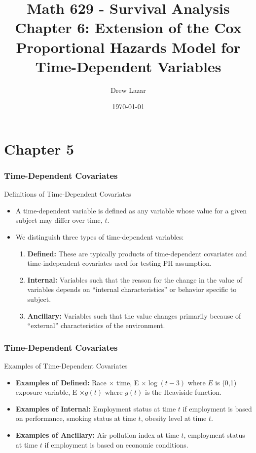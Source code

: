\documentclass{beamer}
\title{Math 629 - Survival Analysis \\ Chapter 6: Extension
of the Cox Proportional Hazards Model for Time-Dependent Variables
}
\author{Drew Lazar}
\institute{Ball State University}
\date{\today}
\theoremstyle{definition}
\begin{document}
\begin{frame}
    \titlepage
\end{frame}



\section{Chapter 5}
\begin{frame}
\frametitle{Time-Dependent Covariates}
\begin{block}{Definitions of Time-Dependent Covariates}
\begin{itemize}
\item A time-dependent variable is defined as any variable whose value for a given subject may differ over time, $t$.
\item We distinguish three types of time-dependent variables:
\begin{enumerate}
\item \textbf{Defined:} These are typically products of time-dependent covariates and time-independent covariates used for testing PH assumption.
\item \textbf{Internal:} Variables such that the reason for the change in the value of variables depends on ``internal characteristics'' or behavior specific to subject.
\item \textbf{Ancillary:} Variables such that the value changes primarily because of ``external'' characteristics of the environment.
\end{enumerate}
\end{itemize}
\end{block}
\end{frame}

\begin{frame}
\frametitle{Time-Dependent Covariates}
\begin{block}{Examples of Time-Dependent Covariates}
\begin{itemize}
\item \textbf{Examples of Defined:} Race $\times$ time, E $\times \log(t-3)$ where $E$ is (0,1) exposure variable, E $\times g(t)$ where $g(t)$ is the Heaviside function.
\item \textbf{Examples of Internal:} Employment status at time $t$ if employment is based on performance, smoking status at time $t$, obesity level at time $t$.
\item \textbf{Examples of Ancillary:} Air pollution index at time $t$, employment status at time $t$ if employment is based on economic conditions.
\end{itemize}
\end{block}
\end{frame}
\end{document}

